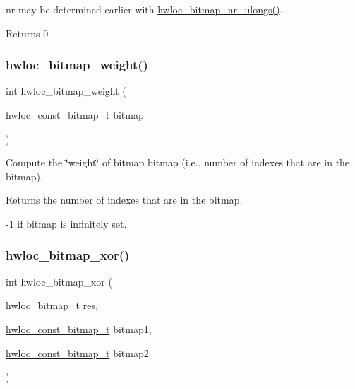 {\ttfamily nr} may be determined earlier with \hyperlink{a00205_gac0744734d761d65c977aece565364908}{hwloc\+\_\+bitmap\+\_\+nr\+\_\+ulongs()}.

\begin{DoxyReturn}{Returns}
0 
\end{DoxyReturn}
\mbox{\label{a00205_ga0200466842c0e1f5da75e84dde460b10}} 
\subsubsection{\texorpdfstring{hwloc\+\_\+bitmap\+\_\+weight()}{hwloc\_bitmap\_weight()}}
{\footnotesize\ttfamily int hwloc\+\_\+bitmap\+\_\+weight (\begin{DoxyParamCaption}\item[{\hyperlink{a00205_gae991a108af01d408be2776c5b2c467b2}{hwloc\+\_\+const\+\_\+bitmap\+\_\+t}}]{bitmap }\end{DoxyParamCaption})}



Compute the \char`\"{}weight\char`\"{} of bitmap {\ttfamily bitmap} (i.\+e., number of indexes that are in the bitmap). 

\begin{DoxyReturn}{Returns}
the number of indexes that are in the bitmap.

-\/1 if {\ttfamily bitmap} is infinitely set. 
\end{DoxyReturn}
\mbox{\label{a00205_ga205508218e09cb9befd0687f16409f09}} 
\subsubsection{\texorpdfstring{hwloc\+\_\+bitmap\+\_\+xor()}{hwloc\_bitmap\_xor()}}
{\footnotesize\ttfamily int hwloc\+\_\+bitmap\+\_\+xor (\begin{DoxyParamCaption}\item[{\hyperlink{a00205_gaa3c2bf4c776d603dcebbb61b0c923d84}{hwloc\+\_\+bitmap\+\_\+t}}]{res,  }\item[{\hyperlink{a00205_gae991a108af01d408be2776c5b2c467b2}{hwloc\+\_\+const\+\_\+bitmap\+\_\+t}}]{bitmap1,  }\item[{\hyperlink{a00205_gae991a108af01d408be2776c5b2c467b2}{hwloc\+\_\+const\+\_\+bitmap\+\_\+t}}]{bitmap2 }\end{DoxyParamCaption})}



